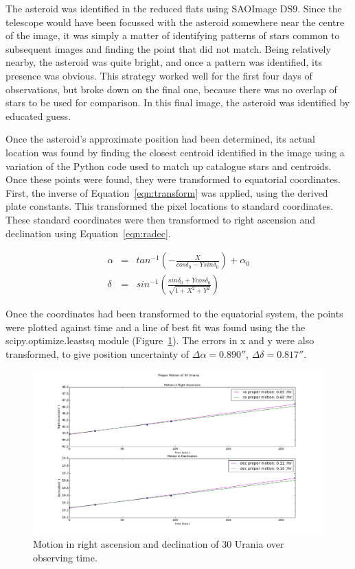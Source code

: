 \documentclass[a4paper,12pt]{article}
\begin{document}
The asteroid was identified in the reduced flats using SAOImage DS9. Since the telescope would have been focussed with the asteroid somewhere near the centre of the image, it was simply a matter of identifying patterns of stars common to subsequent images and finding the point that did not match. Being relatively nearby, the asteroid was quite bright, and once a pattern was identified, its presence was obvious. This strategy worked well for the first four days of observations, but broke down on the final one, because there was no overlap of stars to be used for comparison. In this final image, the asteroid was identified by educated guess.

Once the asteroid's approximate position had been determined, its actual location was found by finding the closest centroid identified in the image using a variation of the Python code used to match up catalogue stars and centroids. Once these points were found, they were transformed to equatorial coordinates. First, the inverse of Equation~\ref{eqn:transform} was applied, using the derived plate constants. This transformed the pixel locations to standard coordinates. These standard coordinates were then transformed to right ascension and declination using Equation~\ref{eqn:radec}.

\begin{equation}
\begin{array}{ccl}
\alpha &=& tan^{-1}\left(-\frac{X}{cos\delta_{0}-Ysin\delta_{0}}\right) + \alpha_{0}\\
\delta &=& sin^{-1}\left(\frac{sin\delta_{0} + Ycos\delta_{0}}{\sqrt{1+X^{2}+Y^{2}}}\right)
\end{array}
\label{eqn:radec}
\end{equation}

Once the coordinates had been transformed to the equatorial system, the points were plotted against time and a line of best fit was found using the the scipy.optimize.leastsq module (Figure~\ref{fig:pm}). The errors in x and y were also transformed, to give position uncertainty of $\Delta\alpha = 0.890''$, $\Delta\delta = 0.817''$.

\begin{figure}[!htbp]
\centering
\includegraphics[scale = 0.35]{proper_motion.png}
\caption{Motion in right ascension and declination of 30 Urania over observing time.}
\label{fig:pm}
\end{figure}
\end{document}
